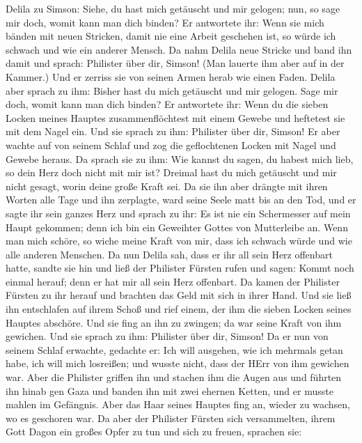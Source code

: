 Delila zu Simson: Siehe, du hast mich getäuscht und mir gelogen; nun, so
sage mir doch, womit kann man dich binden?  Er antwortete
ihr: Wenn sie mich bänden mit neuen Stricken, damit nie eine Arbeit
geschehen ist, so würde ich schwach und wie ein anderer Mensch.
 Da nahm Delila neue Stricke und band ihn damit und sprach:
Philister über dir, Simson! (Man lauerte ihm aber auf in der Kammer.)
Und er zerriss sie von seinen Armen herab wie einen Faden. 
Delila aber sprach zu ihm: Bisher hast du mich getäuscht und mir
gelogen. Sage mir doch, womit kann man dich binden? Er antwortete ihr:
Wenn du die sieben Locken meines Hauptes zusammenflöchtest mit einem
Gewebe und heftetest sie mit dem Nagel ein.  Und sie sprach
zu ihm: Philister über dir, Simson! Er aber wachte auf von seinem Schlaf
und zog die geflochtenen Locken mit Nagel und Gewebe heraus.
 Da sprach sie zu ihm: Wie kannst du sagen, du habest mich
lieb, so dein Herz doch nicht mit mir ist? Dreimal hast du mich
getäuscht und mir nicht gesagt, worin deine große Kraft sei.
 Da sie ihn aber drängte mit ihren Worten alle Tage und ihn
zerplagte, ward seine Seele matt bis an den Tod,  und er
sagte ihr sein ganzes Herz und sprach zu ihr: Es ist nie ein Schermesser
auf mein Haupt gekommen; denn ich bin ein Geweihter Gottes von
Mutterleibe an. Wenn man mich schöre, so wiche meine Kraft von mir, dass
ich schwach würde und wie alle anderen Menschen.  Da nun
Delila sah, dass er ihr all sein Herz offenbart hatte, sandte sie hin
und ließ der Philister Fürsten rufen und sagen: Kommt noch einmal
herauf; denn er hat mir all sein Herz offenbart. Da kamen der Philister
Fürsten zu ihr herauf und brachten das Geld mit sich in ihrer Hand.
 Und sie ließ ihn entschlafen auf ihrem Schoß und rief
einem, der ihm die sieben Locken seines Hauptes abschöre. Und sie fing
an ihn zu zwingen; da war seine Kraft von ihm gewichen. 
Und sie sprach zu ihm: Philister über dir, Simson! Da er nun von seinem
Schlaf erwachte, gedachte er: Ich will ausgehen, wie ich mehrmals getan
habe, ich will mich losreißen; und wusste nicht, dass der HErr von ihm
gewichen war.  Aber die Philister griffen ihn und stachen
ihm die Augen aus und führten ihn hinab gen Gaza und banden ihn mit zwei
ehernen Ketten, und er musste mahlen im Gefängnis.  Aber
das Haar seines Hauptes fing an, wieder zu wachsen, wo es geschoren war.
 Da aber der Philister Fürsten sich versammelten, ihrem
Gott Dagon ein großes Opfer zu tun und sich zu freuen, sprachen sie:
